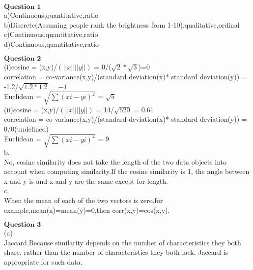 \documentclass[12pt]{article}
\begin{document}
$\textbf{Question 1}$\\

a)Continuous,quantitative,ratio\\

b)Discrete(Assuming people rank the brightness from 1-10),qualitative,ordinal\\

c)Continuous,quantitative,ratio\\

d)Continuous,quantitative,ratio\\

\newpage

$\textbf{Question 2}$\\

(i)cosine = (x,y)/$(||x||||y||)$ = 0/($\sqrt{2}*\sqrt{3}$)=0\\

correlation = co-variance(x,y)/(standard deviation(x)* standard deviation(y)) = -1.2/$\sqrt{1.2*1.2}=-1$\\

Euclidean = $\sqrt{\sum (xi-yi)^2}$ = $\sqrt{5}$\\

(ii)cosine = (x,y)/$(||x||||y||)$ = 14/$\sqrt{520}$ = 0.61\\

correlation = co-variance(x,y)/(standard deviation(x)* standard deviation(y)) = 0/0(undefined)\\

Euclidean = $\sqrt{\sum (xi-yi)^2}$ = 9\\

b.\\

No, cosine similarity does not take the length of the two data objects into account when computing similarity.If the cosine similarity is 1, the
angle between x and y is and x and y are the same except for length.\\

c.\\

When the mean of each of the two vectors is zero,for example,mean(x)=mean(y)=0,then corr(x,y)=cos(x,y).\\


\newpage

$\textbf{Question 3}$\\

(a)\\

Jaccard.Because similarity depends on the
number of characteristics they both share, rather than the number of
characteristics they both lack. Jaccard is appropriate for such data.\\
\end{document}
